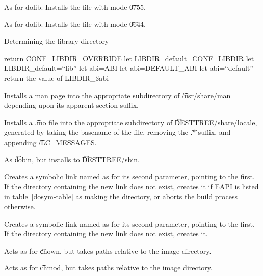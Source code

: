 \begin{description}
\item[dolib.so] As for dolib. Installs the file with mode \t{0755}.

\item[dolib.a] As for dolib. Installs the file with mode \t{0644}.

\begin{algorithm}
\caption{Determining the library directory} \label{ebuild-libdir}
\begin{algorithmic}[1]
    \STATE return CONF\_LIBDIR\_OVERRIDE
\ENDIF
{}
    \STATE let LIBDIR\_default=CONF\_LIBDIR
\ELSE
    \STATE let LIBDIR\_default=``lib''
\ENDIF
{}
    \STATE let abi=ABI
    \STATE let abi=DEFAULT\_ABI
\ELSE
    \STATE let abi=``default''
\ENDIF
\STATE return the value of LIBDIR\_\$abi
\end{algorithmic}
\end{algorithm}

\item[doman] Installs a man page into the appropriate subdirectory of \t{/usr/share/man} depending
    upon its apparent section suffix.

\item[domo] Installs a \t{.mo} file into the appropriate subdirectory of \t{DESTTREE/share/locale},
    generated by taking the basename of the file, removing the \t{.*} suffix, and appending
    \t{/LC\_MESSAGES}.

\item[dosbin] As \t{dobin}, but installs to \t{DESTTREE/sbin}.

\IFKDEBUILDELSE
{
    \item[dosym] Creates a symbolic link named as for its second parameter, pointing to the first. If
        the directory containing the new link does not exist, creates it if EAPI is listed in
        table~\ref{dosym-table} as making the directory, or aborts the build process otherwise.
}{
    \item[dosym] Creates a symbolic link named as for its second parameter, pointing to the first. If
        the directory containing the new link does not exist, creates it.
}

\item[fowners] Acts as for \t{chown}, but takes paths relative to the image directory.

\item[fperms] Acts as for \t{chmod}, but takes paths relative to the image directory.


\end{description}
